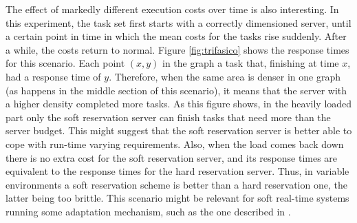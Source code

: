 \documentclass[times, 10pt,twocolumn]{article}
\begin{document}
The effect of markedly different execution costs over time is also
interesting. In this experiment, the task set first starts with a
correctly dimensioned server, until a certain point in time in which
the mean costs for the tasks rise suddenly. After a while, the costs
return to normal. Figure \ref{fig:trifasico} shows the response times
for this scenario. Each point $(x,y)$ in the graph a task that,
finishing at time $x$, had a response time of $y$. Therefore, when the
same area is denser in one graph (as happens in the middle section of
this scenario), it means that the server with a higher density
completed more tasks. As this figure shows, in the heavily loaded part
only the soft reservation server can finish tasks that need more than
the server budget. This might suggest that the soft reservation server
is better able to cope with run-time varying requirements. Also, when
the load comes back down there is no extra cost for the soft
reservation server, and its response times are equivalent to the
response times for the hard reservation server. Thus, in variable
environments a soft reservation scheme is better than a hard
reservation one, the latter being too brittle. This scenario might be
relevant for soft real-time systems running some adaptation mechanism,
such as the one described in \cite{abeni.ea05:qos}.
\end{document}

